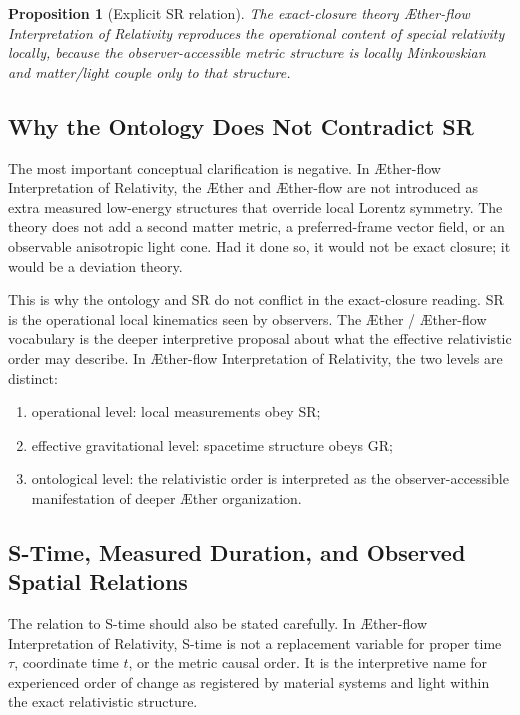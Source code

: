 \documentclass[11pt]{article}
\newcommand{\Aether}{\AE{}ther}
\newcommand{\Aflow}{\AE{}ther-flow}
\newcommand{\TheoryName}{\Aflow{} Interpretation of Relativity}
\newtheorem{proposition}{Proposition}
\begin{document}
\begin{proposition}[Explicit SR relation]
The exact-closure theory \TheoryName{} reproduces the operational content of special relativity locally, because the observer-accessible metric structure is locally Minkowskian and matter/light couple only to that structure.
\end{proposition}

\subsection{Why the Ontology Does Not Contradict SR}

The most important conceptual clarification is negative. In \TheoryName{}, the \Aether{} and \Aflow{} are not introduced as extra measured low-energy structures that override local Lorentz symmetry. The theory does not add a second matter metric, a preferred-frame vector field, or an observable anisotropic light cone. Had it done so, it would not be exact closure; it would be a deviation theory.

This is why the ontology and SR do not conflict in the exact-closure reading. SR is the operational local kinematics seen by observers. The \Aether{} / \Aflow{} vocabulary is the deeper interpretive proposal about what the effective relativistic order may describe. In \TheoryName{}, the two levels are distinct:
\begin{enumerate}
    \item operational level: local measurements obey SR;
    \item effective gravitational level: spacetime structure obeys GR;
    \item ontological level: the relativistic order is interpreted as the observer-accessible manifestation of deeper \Aether{} organization.
\end{enumerate}

\subsection{S-Time, Measured Duration, and Observed Spatial Relations}

The relation to S-time should also be stated carefully. In \TheoryName{}, S-time is not a replacement variable for proper time \(\tau\), coordinate time \(t\), or the metric causal order. It is the interpretive name for experienced order of change as registered by material systems and light within the exact relativistic structure.
\end{document}
